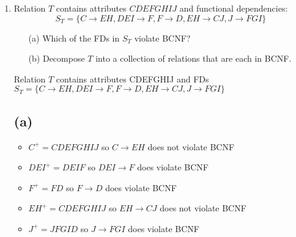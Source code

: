 \documentclass[12pt]{article}
\begin{document}
\begin{enumerate}
  \item Relation $T$ contains attributes $CDEFGHIJ$ and functional dependencies:
  $$S_T = \{C \rightarrow EH, DEI \rightarrow F, F \rightarrow D, EH \rightarrow CJ, J \rightarrow FGI\}$$
  \begin{itemize}
    \item[(a)] Which of the FDs in $S_T$ violate BCNF?
    \item[(b)] Decompose $T$ into a collection of relations that are each in BCNF.
  \end{itemize}

  Relation $T$ contains attributes CDEFGHIJ and FDs 
\newline
$S_T = \{ C \rightarrow EH, DEI \rightarrow F, F \rightarrow D, EH \rightarrow CJ, J \rightarrow FGI\}$
\subsection*{(a)}
\begin{itemize}
    \item $C^+ = CDEFGHIJ$   \; so $C \rightarrow EH$ does not violate BCNF
    \item $DEI^+ = DEIF$     \; so $DEI \rightarrow F$ does violate BCNF
    \item $F^+ = FD$         \; so $F \rightarrow D$ does violate BCNF
    \item $EH^+ = CDEFGHIJ$  \; so $EH \rightarrow CJ$ does not violate BCNF
    \item $J^+ = JFGID$    \; so $J \rightarrow FGI$ does violate BCNF 
\end{itemize}
\newpage

\end{enumerate}
\end{document}
